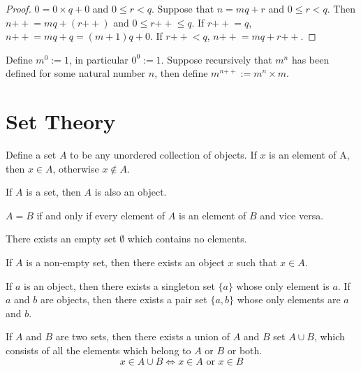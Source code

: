 \documentclass{blog}
\begin{document}
\begin{proof}
  $0 = 0 \times q + 0$ and $0 \leq r < q$.
  Suppose that $n=mq+r$ and $0 \leq r < q$.
  Then $n{++}=mq+(r{++})$ and $0 \leq r{++} \leq q$.
  If $r{++}=q$, $n{++}=mq+q=(m+1)q+0$.
  If $r{++}<q$, $n{++}=mq+r{++}$.
\end{proof}

\begin{definition}[Exponentiation]
  Define $m^{0}:=1$, in particular $0^{0}:=1$.
  Suppose recursively that $m^{n}$ has been defined for some natural number $n$,
  then define $m^{n{++}}:=m^{n} \times m$.
\end{definition}

\section{Set Theory}
\begin{definition}[set]
  Define a set $A$ to be any unordered collection of objects.
  If $x$ is an element of A, then $x \in A$, otherwise $x \notin A$.
\end{definition}

\begin{axiom}
  If $A$ is a set, then $A$ is also an object.
\end{axiom}

\begin{axiom}
  $A=B$ if and only if every element of $A$ is an element of $B$ and vice versa.
\end{axiom}

\begin{axiom}
  There exists an empty set $\emptyset$ which contains no elements.
\end{axiom}

\begin{lemma}
  If $A$ is a non-empty set, then there exists an object $x$ such that $x \in A$.
\end{lemma}

\begin{axiom}
  If $a$ is an object, then there exists a singleton set $\{a\}$ whose only element is $a$.
  If $a$ and $b$ are objects, then there exists a pair set $\{a,b\}$ whose only elements are $a$ and $b$.
\end{axiom}

\begin{axiom}
  If $A$ and $B$ are two sets, then there exists a union of $A$ and $B$ set $A \cup B$,
  which consists of all the elements which belong to $A$ or $B$ or both.
  \begin{equation}
    x \in A \cup B \Longleftrightarrow x \in A \text{ or } x \in B
  \end{equation}
\end{axiom}
\end{document}
